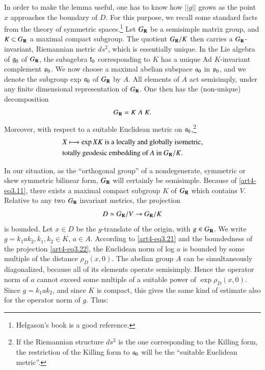 In order to make the lemma useful, one has to know how $||g||$ grows as the point $x$ approaches the boundary of $D$. For this purpose, we recall some standard facts from the theory of symmetric spaces.\footnote[11]{Helgason's book \cite{art4-key27} is a good reference.} Let $G_{\mathbf{R}}$ be a semisimple matrix group, and $K \subset G_{\mathbf{R}}$ a maximal compact subgroup. The quotient $G_{\mathbf{R}} / K$ then carries a $G_{\mathbf{R}}$-invariant, Riemannian metric $ds^2$, which is essentially unique. In the Lie algebra of $\mathfrak{g}_0$ of $G_{\mathbf{R}}$, the subagebra $\mathfrak{k}_0$ corresponding to $K$ has a unique Ad $K$-invariant complement $\mathfrak{p}_0$. We now choose a maximal abelian subspace $\mathfrak{a}_0$ in $\mathfrak{p}_0$, and we denote the subgroup exp $\mathfrak{a}_0$ of $G_{\mathbf{R}}$ by $A$. All elements of $A$ act semisimply, under any finite dimensional representation of $G_{\mathbf{R}}$. One then has the (non-unique) decomposition
\setcounter{equation}{19}
\begin{equation}\label{art4-eq3.20}
G_{\mathbf{R}} = K \; A  \; K.
\end{equation}\pageoriginale
Moreover, with respect to a suitable Euclidean metric on $\mathfrak{a}_0$,\footnote[12]{If the Riemannian structure $ds^2$ is the one corresponding to the Killing form, the restriction of the Killing form to $\mathfrak{a}_0$ will be the ``suitable Euclidean metric''.}
\begin{align}
& X \longmapsto \exp XK \text{ is a locally and globally isometric,}   \notag\\
& \text{totally geodesic embedding of $A$ in $G_{\mathbf{R}}/K$.} \label{art4-eq3.21}
\end{align}

In our situation, as the ``orthogonal group'' of a nondegenerate, symmetric or skew symmetric bilinear form, $G_{\mathbf{R}}$ will certainly be semisimple. Because of \eqref{art4-eq3.11}, there exists a maximal compact subgroup $K$ of $G_{\mathbf{R}}$ which contains $V$. Relative to any two $G_{\mathbf{R}}$ invariant metrics, the projection
\begin{equation}
D\simeq G_{\mathbf{R}} / V \to G_{\mathbf{R}} / K
\label{art4-eq3.22}
\end{equation}
is bounded. Let $x \in D$ be the $g$-translate of the origin, with $g \in G_{\mathbf{R}}$. We write $g = k_1 a k_2, k_1, k_2 \in K$, $a \in A$. According to \eqref{art4-eq3.21} and the boundedness of the projection \eqref{art4-eq3.22}, the Euclidean norm of log $a$ is bounded by some multiple of the distance $\rho_D (x,0)$. The abelian group $A$ can be simultaneously diagonalized, because all of its elements operate semisimply. Hence the operator norm of $a$ cannot exceed some multiple of a suitable power of $\exp \rho_D (x, 0)$. Since $g = k_1 a k_2$, and since $K$ is compact, this gives the same kind of estimate also for the operator norm of $g$. Thus:

